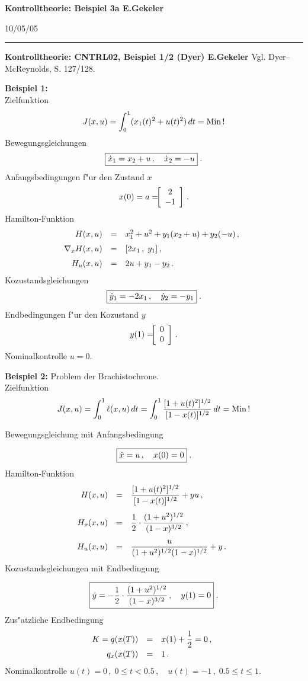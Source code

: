 \documentclass[12pt,a4paper,twoside,leqno]{article}
\newcommand{\Release}{10/05/05} %
\begin{document}
{\large\bf Kontrolltheorie: Beispiel 3a \hfill E.Gekeler}
\par
\vspace{-0.5ex}
\hfill{\footnotesize\Release\ }
\par\hrule\par\vspace{2ex}
{\large\bf Kontrolltheorie: CNTRL02, Beispiel 1/2 (Dyer) \hfill E.Gekeler}
Vgl. {\sc Dyer--McReynolds}, S. 127/128.

{\bf Beispiel 1:}\\
Zielfunktion
\[
J(x,u) = \int_0^1(x_1(t)^2 + u(t)^2)\, dt = \Min\, !
\]
Bewegungsgleichungen
\[
\fbox{$
\dot{x}_1 = x_2 + u\,, \quad \dot{x}_2 = - u
$}\; .
\]
Anfangsbedingungen f"ur den Zustand $x$
\[
x(0) = a = \ba{[}{c}2\\-1\ea{]}\, .
\]
{\sc Hamilton}-Funktion
\[
\ba{.}{rcl}
H(x,u) &=& x_1^2 + u^2 + y_1(x_2 + u) + y_2(-u)\,,\\[2mm]
\nabla_x H(x,u) &=& [2x_1\,, \; y_1]\,,\\[2mm]
H_u(x,u) &=& 2u + y_1 -y_2\, .
\ea{.}
\]
Kozustandsgleichungen
\[
\fbox{$
\dot{y}_1 = -2x_1\,, \quad \dot{y}_2 = -y_1
$}\; .
\]
Endbedingungen f"ur den Kozustand $y$
\[
y(1) = \ba{[}{c}0\\0\ea{]}\,.
\]
Nominalkontrolle $u = 0$.
\par\vspace{0.5ex}
{\bf Beispiel 2:} Problem der Brachistochrone.\\
Zielfunktion
\[
J(x,u) =
\int_0^1\ell(x,u)\, dt
= \int_0^1\frac{[1 + u(t)^2]^{1/2}}{[1 - x(t)]^{1/2}}\, dt = \Min \, !
\]

Bewegungsgleichung mit Anfangsbedingung

\[
\fbox{$
\dot{x} = u\,, \quad x(0) = 0
$}\; .
\]
{\sc Hamilton}-Funktion
\[
\ba{.}{rcl}
H(x,u) &=& \dis
\frac{[1 + u(t)^2]^{1/2}}{[1 - x(t)]^{1/2}} + yu\,,\\[5mm]
H_x(x,u) &=& \dis
\frac12\cdot \frac{(1+u^2)^{1/2}}{(1 - x)^{3/2}}\,,\\[5mm]
H_u(x,u) &=& \dis
\frac{u}{(1+u^2)^{1/2}(1 - x)^{1/2}} + y\,.
\ea{.}
\]
Kozustandsgleichungen mit Endbedingung

\[
\fbox{$
\dot{y}= \dis -
\frac12\cdot \frac{(1+u^2)^{1/2}}{(1 - x)^{3/2}}\,, \quad y(1) = 0
$}\; .
\]
Zus"atzliche Endbedingung
\[
\ba{.}{rcl}
K = q(x(T)) &=& \dis x(1) + \frac12 = 0\,,\\[2mm]
q_x(x(T))   &=&  1\,.
\ea{.}
\]
Nominalkontrolle $u(t) = 0\,, \; 0 \leq t < 0.5\,, \quad u(t) = - 1\,,\;
0.5 \leq t \leq 1$.
\end{document}
